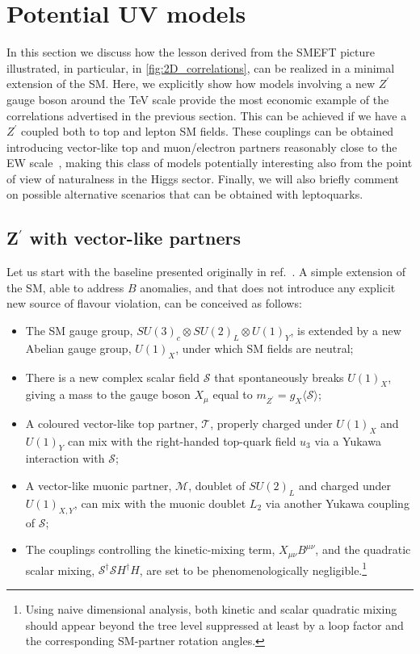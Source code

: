 \section{Potential UV models}
\label{sec:UVtoymodels}
In this section we discuss how the lesson derived from the SMEFT picture illustrated, in particular, in \autoref{fig:2D_correlations}, can be realized in a minimal extension of the SM. Here, we explicitly show how models involving a new $Z^\prime$ gauge boson around the TeV scale provide the most economic example of the correlations advertised in the previous section. 
This can be achieved if we have a $Z^\prime$ coupled both to top and lepton SM fields.
These couplings can be obtained introducing vector-like top and muon/electron partners reasonably close to the EW scale~\cite{Kamenik:2017tnu,Fox:2018ldq}, making this class of models potentially interesting also from the point of view of naturalness in the Higgs sector.
Finally, we will also briefly comment on possible alternative scenarios that can be obtained with leptoquarks.

\subsection{\texorpdfstring{Z$^{\prime}$}{Z'} with vector-like partners}
\label{sec:mod_Zprime}

Let us start with the baseline presented originally in ref.~\cite{Kamenik:2017tnu}. A simple extension of the SM, able to address $B$ anomalies, and  that does not introduce any explicit new source of flavour violation, can be conceived as follows:
\begin{itemize}
	\item The SM gauge group, $SU(3)_{c} \otimes SU(2)_{L} \otimes U(1)_{Y}$, is extended by a new Abelian gauge group, $U(1)_{X}$, under which SM fields are neutral;
	\item There is a new complex scalar field $\mathcal{S}$ that spontaneously breaks $U(1)_{X}$, giving a mass to the gauge boson $X_{\mu}$ equal to $m_{Z^{\prime}} = g_{X} \langle \mathcal{S} \rangle $;
	\item A coloured vector-like top partner, $\mathcal{T}$, properly charged under $U(1)_{X}$ and $U(1)_{Y}$ can mix with the right-handed top-quark field $u_{3}$ via a Yukawa interaction with $\mathcal{S}$; 
	\item A vector-like muonic partner, $\mathcal{M}$, doublet of $SU(2)_{L}$ and charged under $U(1)_{X,Y}$, can mix with the muonic doublet $L_2$ via another Yukawa coupling of $\mathcal{S}$;
	\item The couplings controlling the kinetic-mixing term, $X_{\mu \nu} B^{\mu \nu}$, and the quadratic scalar mixing, $\mathcal{S}^{\dagger}\mathcal{S} H^{\dagger} H$, are set to be phenomenologically negligible.\footnote{Using naive dimensional analysis, both kinetic and scalar quadratic mixing should appear beyond the tree level suppressed at least by a loop factor and the corresponding SM-partner rotation angles.} 
\end{itemize}


